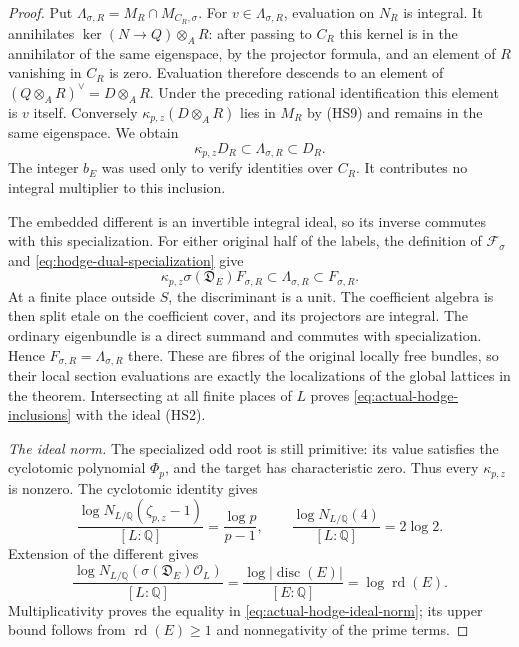 \begin{proof}
Put $\Lambda_{\sigma,R}=M_R\cap M_{C_R,\sigma}$. For
$v\in\Lambda_{\sigma,R}$, evaluation on $N_R$ is integral. It
annihilates $\ker(N\to Q)\otimes_A R$: after passing to $C_R$
this kernel is in the annihilator of the same eigenspace, by the
projector formula, and an element of $R$ vanishing in $C_R$ is
zero. Evaluation therefore descends to an element of
$(Q\otimes_A R)^\vee=D\otimes_A R$. Under the preceding rational
identification this element is $v$ itself. Conversely
$\kappa_{p,z}(D\otimes_A R)$ lies in $M_R$ by \textup{(HS9)}
and remains in the same eigenspace. We obtain
\begin{equation}\label{eq:hodge-dual-specialization}
 \kappa_{p,z}D_R\subset\Lambda_{\sigma,R}\subset D_R.
\end{equation}
The integer $b_E$ was used only to verify identities over $C_R$.
It contributes no integral multiplier to this inclusion.

The embedded different is an invertible integral ideal, so its
inverse commutes with this specialization. For either original
half of the labels, the definition of $\mathcal F_\sigma$ and
\eqref{eq:hodge-dual-specialization} give
\[
 \kappa_{p,z}\sigma(\mathfrak D_E)F_{\sigma,R}
                 \subset\Lambda_{\sigma,R}\subset F_{\sigma,R}.
 \tag{HS10}
\]
At a finite place outside $S$, the discriminant is a unit. The
coefficient algebra is then split etale on the coefficient cover,
and its projectors are integral. The ordinary eigenbundle is a
direct summand and commutes with specialization. Hence
$F_{\sigma,R}=\Lambda_{\sigma,R}$ there.
These are fibres of the original locally free bundles, so their
local section evaluations are exactly the localizations of the
global lattices in the theorem. Intersecting at all finite places
of $L$ proves \eqref{eq:actual-hodge-inclusions} with the ideal
\textup{(HS2)}.

\emph{The ideal norm.}
The specialized odd root is still primitive: its value satisfies
the cyclotomic polynomial $\Phi_p$, and the target has
characteristic zero. Thus every $\kappa_{p,z}$ is nonzero. The
cyclotomic identity gives
\[
 \frac{\log N_{L/\mathbb Q}(\zeta_{p,z}-1)}{[L:\mathbb Q]}
       =\frac{\log p}{p-1},\qquad
 \frac{\log N_{L/\mathbb Q}(4)}{[L:\mathbb Q]}=2\log2.
\]
Extension of the different gives
\[
 \frac{\log N_{L/\mathbb Q}
                  (\sigma(\mathfrak D_E)\mathcal O_L)}{[L:\mathbb Q]}
       =\frac{\log|\operatorname{disc}(E)|}{[E:\mathbb Q]}
       =\log\operatorname{rd}(E).
\]
Multiplicativity proves the equality in
\eqref{eq:actual-hodge-ideal-norm}; its upper bound follows from
$\operatorname{rd}(E)\ge1$ and nonnegativity of the prime terms.
\end{proof}

